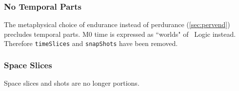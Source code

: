 \subsubsection{No Temporal Parts}\label{subsec:ntp}

\pn The metaphysical choice of endurance instead of perdurance (\ref{sec:pervend}) precludes temporal parts.
M0 time is expressed as ``worlds" of \logicid~Logic instead.  Therefore \texttt{timeSlices} and \texttt{snapShots} have
been removed. 

\subsubsection{Space Slices}\label{subsec:spaceslices}

Space slices and shots are no longer portions.

